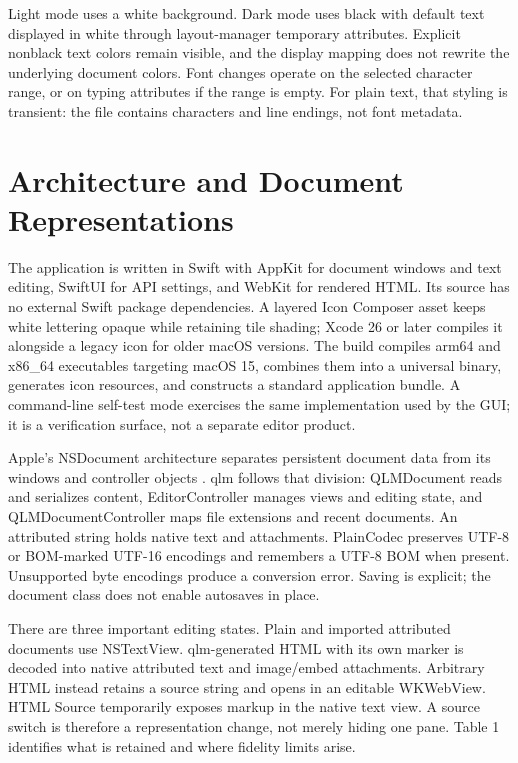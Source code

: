 \documentclass[manuscript,screen,nonacm]{acmart}
\begin{document}
Light mode uses a white background. Dark mode uses black with default text displayed in white through layout-manager temporary attributes. Explicit nonblack text colors remain visible, and the display mapping does not rewrite the underlying document colors. Font changes operate on the selected character range, or on typing attributes if the range is empty. For plain text, that styling is transient: the file contains characters and line endings, not font metadata.

\section{Architecture and Document Representations}

The application is written in Swift with AppKit for document windows and text editing, SwiftUI for API settings, and WebKit for rendered HTML. Its source has no external Swift package dependencies. A layered Icon Composer asset keeps white lettering opaque while retaining tile shading; Xcode 26 or later compiles it alongside a legacy icon for older macOS versions. The build compiles arm64 and x86\_64 executables targeting macOS 15, combines them into a universal binary, generates icon resources, and constructs a standard application bundle. A command-line self-test mode exercises the same implementation used by the GUI; it is a verification surface, not a separate editor product.

Apple's NSDocument architecture separates persistent document data from its windows and controller objects \cite{nsdocument}. qlm follows that division: QLMDocument reads and serializes content, EditorController manages views and editing state, and QLMDocumentController maps file extensions and recent documents. An attributed string holds native text and attachments. PlainCodec preserves UTF-8 or BOM-marked UTF-16 encodings and remembers a UTF-8 BOM when present. Unsupported byte encodings produce a conversion error. Saving is explicit; the document class does not enable autosaves in place.

There are three important editing states. Plain and imported attributed documents use NSTextView. qlm-generated HTML with its own marker is decoded into native attributed text and image/embed attachments. Arbitrary HTML instead retains a source string and opens in an editable WKWebView. HTML Source temporarily exposes markup in the native text view. A source switch is therefore a representation change, not merely hiding one pane. Table 1 identifies what is retained and where fidelity limits arise.
\end{document}

